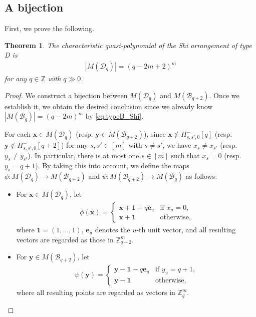 \documentclass{article}
\theoremstyle{plain}
\newtheorem{Them}{Theorem}[section]
\theoremstyle{definition}
\theoremstyle{remark}
\numberwithin{equation}{section}
\newcommand{\Bc}{\mathcal{B}}
\newcommand{\Dc}{\mathcal{D}}
\newcommand{\ZZ}{\mathbb{Z}}
\begin{document}
\subsection{A bijection}\label{sec:bij}
First, we prove the following. 
\begin{Them}\label{thm-chara-quasi-TypeD}
    The characteristic quasi-polynomial of the Shi arrangement of type D is 
\begin{align*}
\left|M(\Dc_q)\right|=(q-2m+2)^m
\end{align*}
for any $q\in\mathbb{Z}$ with $q\gg 0$.
\end{Them}
\begin{proof}
We construct a bijection between $M(\Dc_q)$ and $M(\Bc_{q+2})$. 
Once we establish it, we obtain the desired conclusion since we already know $\left|M(\Bc_q)\right|=(q-2m)^m$ by \eqref{eq:typeB_Shi}.  



\medskip

For each $\bm{x} \in M(\Dc_q)$ (resp. $\bm{y} \in M(\Bc_{q+2})$), since $\bm{x} \not\in H_{s,s',0}^-[q]$ (resp. $\bm{y} \not\in H_{s,s',0}^-[q+2]$) for any $s,s' \in [m]$ with $s \neq s'$, we have $x_s \neq x_{s'}$ (resp. $y_s \neq y_{s'}$). 
In particular, there is at most one $s \in [m]$ such that $x_s=0$ (resp. $y_s=q+1$). 
By taking this into account, we define the maps $\phi : M(\Dc_q) \to M(\Bc_{q+2})$ and $\psi : M(\Bc_{q+2}) \to M(\Bc_q)$ as follows:
\begin{itemize}
    \item For $\bm{x} \in M(\Dc_q)$, let
    \begin{align*}
        \phi(\bm{x})=
        \begin{cases}
            \bm{x} + \bm{1} + q\bm{e}_u &\text{if $x_u = 0$}, \\
            \bm{x} + \bm{1} &\text{otherwise}, 
        \end{cases}
    \end{align*}
    where $\bm{1} = (1, \ldots, 1)$, $\bm{e}_u$ denotes the $u$-th unit vector, and all resulting vectors are regarded as those in $\ZZ_{q+2}^m$. 
\end{itemize}
\begin{itemize}
    \item For $\bm{y} \in M(\Bc_{q+2})$, let
    \begin{align*}
        \psi(\bm{y})=
        \begin{cases}
            \bm{y} - \bm{1} - q\bm{e}_u &\text{if $y_u = q+1$}, \\
            \bm{y} - \bm{1} &\text{otherwise}, 
        \end{cases}
    \end{align*}
where all resulting points are regarded as vectors in $\ZZ_q^m$. 
\end{itemize}



\end{proof}
\end{document}
